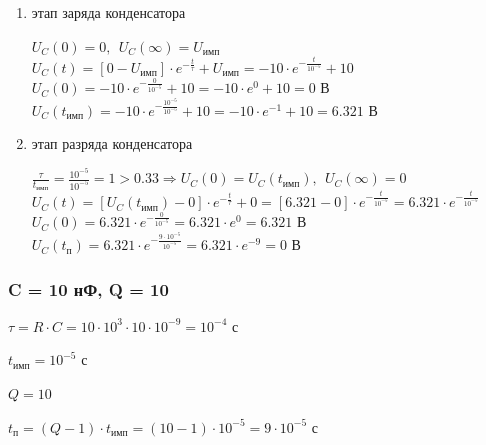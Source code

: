 \begin{enumerate}
\item этап заряда конденсатора

	$U_C(0) = 0,\ \ U_C(\infty) = U_\text{имп}$\\
	$U_C(t) = [0 - U_\text{имп}] \cdot e^{-\frac{t}{\tau}} + U_\text{имп} = -10 \cdot e^{-\frac{t}{10^{-5}}} + 10$\\
	$U_C(0) = -10 \cdot e^{-\frac{0}{10^{-5}}} + 10 = -10 \cdot e^0 + 10 = 0 \text{ В}$\\
	$U_C(t_\text{имп}) = -10 \cdot e^{-\frac{10^{-5}}{10^{-5}}} + 10 = -10 \cdot e^{-1} + 10 = 6.321 \text{ В}$

\item этап разряда конденсатора

	$\frac{\tau}{t_\text{имп}} = \frac{10^{-5}}{10^{-5}} = 1 > 0.33 \Rightarrow U_C(0) = U_C(t_\text{имп}),\ \ U_C(\infty) = 0$\\
	$U_C(t) = [U_C(t_\text{имп}) - 0] \cdot e^{-\frac{t}{\tau}} + 0 =  [6.321 - 0] \cdot e^{-\frac{t}{10^{-5}}} = 6.321 \cdot e^{-\frac{t}{10^{-5}}}$\\
	$U_C(0) = 6.321 \cdot e^{-\frac{0}{10^{-5}}} = 6.321 \cdot e^0 = 6.321 \text{ В}$\\
	$U_C(t_\text{п}) = 6.321 \cdot e^{-\frac{9 \cdot 10^{-5}}{10^{-5}}} = 6.321 \cdot e^{-9} = 0 \text{ В}$
\end{enumerate}

\subsubsection{C = 10 нФ, Q = 10}

$\tau = R \cdot C = 10 \cdot 10^3 \cdot 10 \cdot 10^{-9} = 10^{-4} \text{ с}$

$t_\text{имп} = 10^{-5} \text{ с}$

$Q = 10$		

$t_\text{п} = (Q - 1) \cdot t_\text{имп} = (10 - 1) \cdot 10^{-5} = 9 \cdot 10^{-5} \text{ с}$

